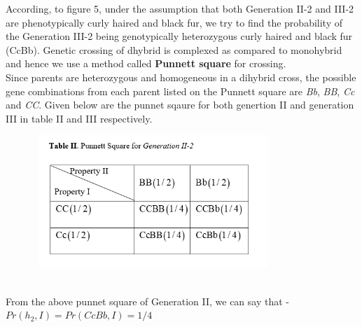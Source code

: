 \documentclass{article}
\begin{document}
\begin{itemize}
     According, to figure 5, under the assumption that both Generation II-2 and III-2 are phenotypically curly haired and black fur, we try to find the probability of the Generation III-2 being genotypically heterozygous curly haired and black fur (CcBb). Genetic crossing of dhybrid is complexed as compared to monohybrid and hence we use a method called \textbf{Punnett square} for crossing.\\
    Since parents are heterozygous and homogeneous in a dihybrid cross, the possible gene combinations from each parent listed on the Punnett square are \textit{Bb}, \textit{BB}, \textit{Cc} and \textit{CC}. Given below are the punnet sqaure for both genertion II and generation III in table II and III respectively.
    \pagebreak
    \begin{figure}[h]
    	\centering
    	\includegraphics[height=5cm,width=9cm]{table2}
    \end{figure}\\
    From the above punnet square of Generation II, we can say that -\\
    
    	\hspace{4cm}$ Pr(h_2,I) = Pr(CcBb,I) = 1/4 $ \\
      

\end{itemize}
\end{document}
